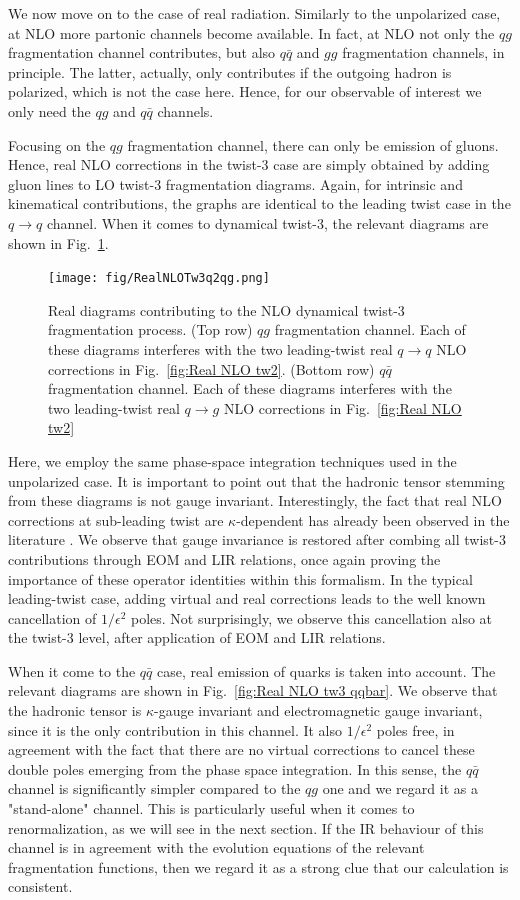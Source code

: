 We now move on to the case of real radiation. Similarly to the unpolarized case, at NLO more partonic channels become available. In fact, at NLO not only the $qg$ fragmentation channel contributes, but also $q\bar{q}$ and $gg$ fragmentation channels, in principle. The latter, actually, only contributes if the outgoing hadron is polarized, which is not the case here. Hence, for our observable of interest we only need the $qg$ and $q\bar{q}$ channels.

Focusing on the $qg$ fragmentation channel, there can only be emission of gluons. Hence, real NLO corrections in the twist-3 case are simply obtained by adding gluon lines to LO twist-3 fragmentation diagrams. Again, for intrinsic and kinematical contributions, the graphs are identical to the leading twist case in the $q\to q$ channel. When it comes to dynamical twist-3, the relevant diagrams are shown in Fig.~\ref{fig:Real NLO tw3}.
\begin{figure}
    \centering
    \texttt{[image: fig/RealNLOTw3q2qg.png]}
    \caption{Real diagrams contributing to the NLO dynamical twist-3 fragmentation process. (Top row) $qg$ fragmentation channel. Each of these diagrams interferes with the two leading-twist real $q \to q$ NLO corrections in Fig.~\ref{fig:Real NLO tw2}. (Bottom row) $q\bar{q}$ fragmentation channel. Each of these diagrams interferes with the two leading-twist real $q \to g$ NLO corrections in Fig.~\ref{fig:Real NLO tw2}}
    \label{fig:Real NLO tw3}
\end{figure}
Here, we employ the same phase-space integration techniques used in the unpolarized case. It is important to point out that the hadronic tensor stemming from these diagrams is not gauge invariant. Interestingly, the fact that real NLO corrections at sub-leading twist are $\kappa$-dependent has already been observed in the literature \cite{rein2025, Gamberg_2019}. We observe that gauge invariance is restored after combing all twist-3 contributions through EOM and LIR relations, once again proving the importance of these operator identities within this formalism. In the typical leading-twist case, adding virtual and real corrections leads to the well known cancellation of $1/\epsilon^2$ poles. Not surprisingly, we observe this cancellation also at the twist-3 level, after application of EOM and LIR relations.

When it come to the $q\bar{q}$ case, real emission of quarks is taken into account. The relevant diagrams are shown in Fig.~\ref{fig:Real NLO tw3 qqbar}. We observe that the hadronic tensor is $\kappa$-gauge invariant and electromagnetic gauge invariant, since it is the only contribution in this channel. It also $1/\epsilon^2$ poles free, in agreement with the fact that there are no virtual corrections to cancel these double poles emerging from the phase space integration. In this sense, the $q\bar{q}$ channel is significantly simpler compared to the $qg$ one and we regard it as a "stand-alone" channel. This is particularly useful when it comes to renormalization, as we will see in the next section. If the IR behaviour of this channel is in agreement with the evolution equations of the relevant fragmentation functions, then we regard it as a strong clue that our calculation is consistent.

